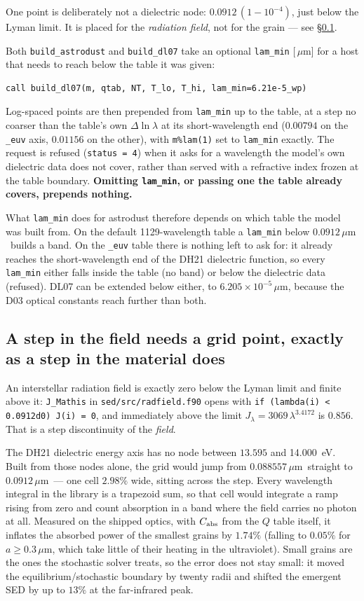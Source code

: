 \documentclass{my_memo}
\newcommand{\code}[1]{\texttt{#1}}
\newcommand{\um}{\ensuremath{\,\mu\mathrm{m}}}
\begin{document}
One point is deliberately not a dielectric node: $0.0912\,(1-10^{-4})$, just
below the Lyman limit. It is placed for the \emph{radiation field}, not for the
grain --- see \S\ref{sec:euv-lyman}.

Both \code{build\_astrodust} and \code{build\_dl07} take an optional
\code{lam\_min} [\um] for a host that needs to reach below the table it was
given:
\begin{lstlisting}
call build_dl07(m, qtab, NT, T_lo, T_hi, lam_min=6.21e-5_wp)
\end{lstlisting}
Log-spaced points are then prepended from \code{lam\_min} up to the table, at a
step no coarser than the table's own $\Delta\ln\lambda$ at its short-wavelength
end ($0.00794$ on the \code{\_euv} axis, $0.01156$ on the other), with
\code{m\%lam(1)} set to \code{lam\_min} exactly. The
request is refused (\code{status = 4}) when it asks for a wavelength the model's
own dielectric data does not cover, rather than served with a refractive index
frozen at the table boundary. \textbf{Omitting \code{lam\_min}, or passing one
the table already covers, prepends nothing.}

What \code{lam\_min} does for astrodust therefore depends on which table the
model was built from. On the default 1129-wavelength table a \code{lam\_min}
below $0.0912$\um\ builds a band. On the \code{\_euv} table there is nothing
left to ask for: it already reaches the short-wavelength end of the DH21
dielectric function, so every \code{lam\_min} either falls inside the table (no
band) or below the dielectric data (refused). DL07 can be extended below either,
to $6.205\times10^{-5}$\um, because the D03 optical constants reach further than
both.

\subsection{A step in the field needs a grid point, exactly as a step in the
material does}\label{sec:euv-lyman}

An interstellar radiation field is exactly zero below the Lyman limit and finite
above it: \code{J\_Mathis} in \code{sed/src/radfield.f90} opens with
\code{if (lambda(i) < 0.0912d0) J(i) = 0}, and immediately above the limit
$J_\lambda = 3069\,\lambda^{3.4172}$ is $0.856$. That is a step discontinuity of
the \emph{field}.

The DH21 dielectric energy axis has no node between $13.595$ and
\SI{14.000}{\electronvolt}. Built from those nodes alone, the grid would jump
from $0.088557$\um\ straight to $0.0912$\um\ --- one cell $2.98\%$ wide, sitting
across the step. Every wavelength integral in the library is a trapezoid sum, so
that cell would integrate a ramp rising from zero and count absorption in a band
where the field carries no photon at all. Measured on the shipped optics, with
$C_{\rm abs}$ from the $Q$ table itself, it inflates the absorbed power of the
smallest grains by $1.74\%$ (falling to $0.05\%$ for $a\ge0.3$\um, which take
little of their heating in the ultraviolet). Small grains are the ones the
stochastic solver treats, so the error does not stay small: it moved the
equilibrium/stochastic boundary by twenty radii and shifted the emergent SED by
up to $13\%$ at the far-infrared peak.
\end{document}
